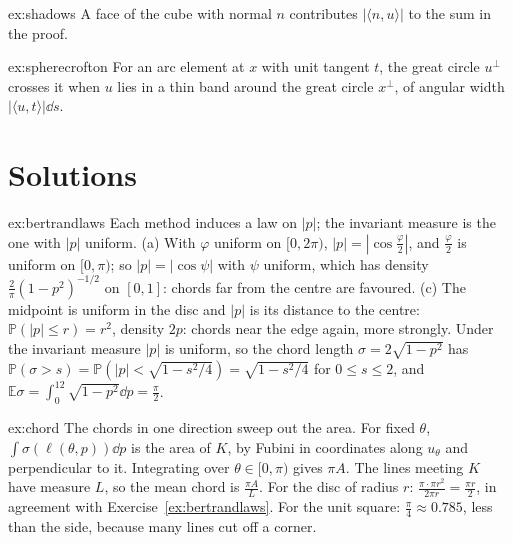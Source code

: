 \begin{hint}{ex:shadows}
A face of the cube with normal $n$ contributes $|\langle n,u\rangle|$ to the sum in the proof.
\end{hint}

\begin{hint}{ex:spherecrofton}
For an arc element at $x$ with unit tangent $t$, the great circle $u^\perp$ crosses it when $u$ lies in a thin band around the great circle $x^\perp$, of angular width $|\langle u,t\rangle|\dd s$.
\end{hint}

\section{Solutions}

\begin{solution}{ex:bertrandlaws}
\idea Each method induces a law on $|p|$; the invariant measure is the one with $|p|$ uniform.
\writeup (a) With $\varphi$ uniform on $[0,2\pi)$, $|p|=|\cos\frac\varphi2|$, and $\frac\varphi2$ is uniform on $[0,\pi)$; so $|p|=|\cos\psi|$ with $\psi$ uniform, which has density $\frac2\pi(1-p^2)^{-1/2}$ on $[0,1]$: chords far from the centre are
favoured. (c) The midpoint is uniform in the disc and $|p|$ is its distance to the centre: $\mathbb P(|p|\le r)=r^2$, density $2p$: chords near the edge again, more strongly. Under the invariant measure $|p|$ is uniform, so the
chord length $\sigma=2\sqrt{1-p^2}$ has $\mathbb P(\sigma>s)=\mathbb P(|p|<\sqrt{1-s^2/4})=\sqrt{1-s^2/4}$ for $0\le s\le2$, and $\mathbb E\sigma=\int_0^12\sqrt{1-p^2}\dd p=\frac\pi2$.
\end{solution}

\begin{solution}{ex:chord}
\idea The chords in one direction sweep out the area.
\writeup For fixed $\theta$, $\int\sigma(\ell(\theta,p))\dd p$ is the area of $K$, by Fubini in coordinates along $u_\theta$ and perpendicular to it. Integrating over $\theta\in[0,\pi)$ gives $\pi A$. The lines meeting $K$ have measure
$L$, so the mean chord is $\frac{\pi A}L$. For the disc of radius $r$: $\frac{\pi\cdot\pi r^2}{2\pi r}=\frac{\pi r}2$, in agreement with Exercise~\ref{ex:bertrandlaws}. For the unit square: $\frac\pi4\approx0.785$, less than the side, because many
lines cut off a corner.
\end{solution}

